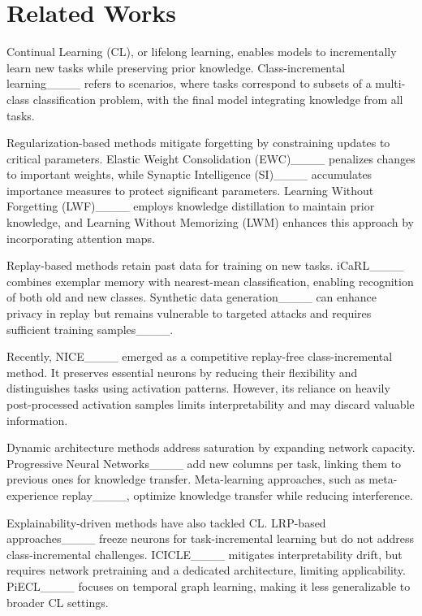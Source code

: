 \section{Related Works}
Continual Learning (CL), or lifelong learning, enables models to incrementally learn new tasks while preserving prior knowledge. Class-incremental learning____ refers to scenarios, where tasks correspond to subsets of a multi-class classification problem, with the final model integrating knowledge from all tasks.  

Regularization-based methods mitigate forgetting by constraining updates to critical parameters. Elastic Weight Consolidation (EWC)____ penalizes changes to important weights, while Synaptic Intelligence (SI)____ accumulates importance measures to protect significant parameters. Learning Without Forgetting (LWF)____ employs knowledge distillation to maintain prior knowledge, and Learning Without Memorizing (LWM) enhances this approach by incorporating attention maps.  

Replay-based methods retain past data for training on new tasks. iCaRL____ combines exemplar memory with nearest-mean classification, enabling recognition of both old and new classes. Synthetic data generation____ can enhance privacy in replay but remains vulnerable to targeted attacks and requires sufficient training samples____.  

Recently, NICE____ emerged as a competitive replay-free class-incremental method. It preserves essential neurons by reducing their flexibility and distinguishes tasks using activation patterns. However, its reliance on heavily post-processed activation samples limits interpretability and may discard valuable information.  

Dynamic architecture methods address saturation by expanding network capacity. Progressive Neural Networks____ add new columns per task, linking them to previous ones for knowledge transfer. Meta-learning approaches, such as meta-experience replay____, optimize knowledge transfer while reducing interference.  

Explainability-driven methods have also tackled CL. LRP-based approaches____ freeze neurons for task-incremental learning but do not address class-incremental challenges. ICICLE____ mitigates interpretability drift, but requires network pretraining and a dedicated architecture, limiting applicability. PiECL____ focuses on temporal graph learning, making it less generalizable to broader CL settings.